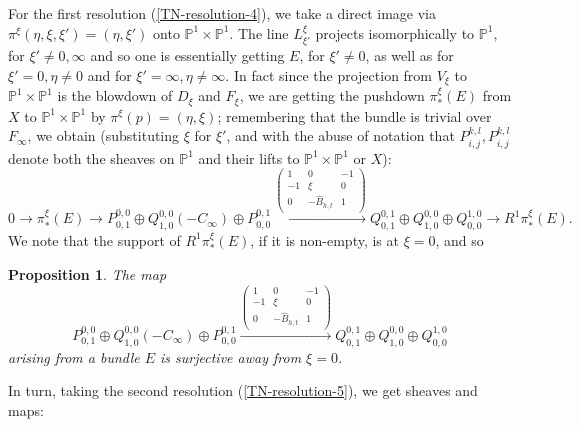 \documentclass[12pt]{article}
\newtheorem{proposition}[theorem]{Proposition}
\theoremstyle{definition}
\theoremstyle{remark}
\numberwithin{theorem}{section}
\def\bP{{\mathbb {P}}}
\begin{document}
For the first resolution (\ref{TN-resolution-4}), we take a direct image via $\pi^\xi(\eta,\xi,\xi') =  (\eta,\xi')$ onto $\bP^1\times \bP^1$. The line $L^\xi_{\xi'}$ projects isomorphically to $\bP^1$, for $\xi'  \neq 0, \infty$ and so one is essentially getting $E$, for $\xi'\neq 0$, as well as for $\xi'=0, \eta\neq 0$ and for $\xi'=\infty, \eta\neq \infty$. In fact since the projection from $V_\xi$ to $\bP^1\times \bP^1$ is  the blowdown of $D_\xi$ and $F_\xi$, we are getting the pushdown $  \pi^\xi_* (E)$ from $X$ to $\bP^1\times \bP^1$ by $\pi^\xi(p) = (\eta,\xi)$; remembering that the bundle is trivial over $F_\infty$, we obtain  (substituting $\xi$ for $\xi'$, and with the abuse of notation that $P_{i,j}^{k,l}, P_{i,j}^{k,l}$ denote both the sheaves on $\bP^1$ and  their lifts to $\bP^1\times \bP^1$ or $X$):
\begin{equation}\label{pushdownxi}
0\rightarrow  \pi^\xi_* (E) \rightarrow  
	{\scriptstyle   
P_{0,1}^{0,0}\oplus Q_{1,0}^{0,0}(-C_\infty)\oplus P_{0,0}^{0,1}  \xrightarrow{\left(\begin{smallmatrix}1&0&-1\\-1&\xi&0\\ 0&-\widehat B_{h,t}&1\end{smallmatrix}\right)}  Q_{0,1}^{0,1}\oplus Q_{1,0}^{0,0}\oplus  Q_{0 ,0}^{ 1,0} 
	}
\rightarrow R^1\pi^\xi_*(E).
\end{equation}
We note that the support of $R^1\pi^\xi_*(E)$, if it is non-empty, is at $\xi = 0$, and so
\begin{proposition} \label{gen1} The map 
$$  P_{0,1}^{0,0}\oplus Q_{1,0}^{0,0}(-C_\infty)\oplus P_{0,0}^{0,1} \xrightarrow{\begin{pmatrix}1&0&-1\\-1&\xi&0\\ 0&-\widehat B_{h,t}&1\end{pmatrix}} Q_{0,1}^{0,1}\oplus Q_{1,0}^{0,0}\oplus  Q_{0 ,0}^{ 1,0}$$
arising from a bundle $E$ is surjective away from $\xi= 0$.
\end{proposition}

In turn, taking the second resolution (\ref{TN-resolution-5}), we get  sheaves and maps:
\end{document}
